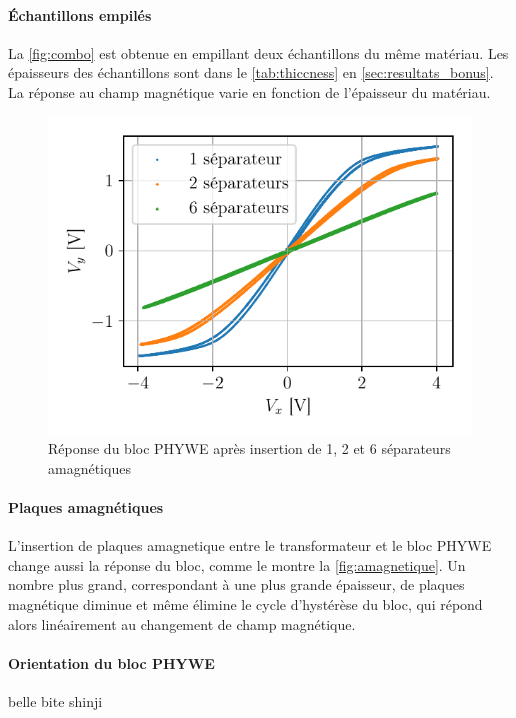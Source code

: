 \begin{minipage}{\linewidth}
    \paragraph{Échantillons empilés}
    La \autoref{fig:combo} est obtenue en empillant deux échantillons du même matériau. Les épaisseurs des échantillons sont dans le \autoref{tab:thiccness} en \autoref{sec:resultats_bonus}. La réponse au champ magnétique varie en fonction de l'épaisseur du matériau.

    \begin{figure}
        \centering
        \includegraphics[width=\linewidth]{figures/separateurs_amagnetique.pdf}
        \caption{Réponse du bloc PHYWE après insertion de 1, 2 et 6 séparateurs amagnétiques}
        \label{fig:amagnetique}
    \end{figure}

    \paragraph{Plaques amagnétiques}
    L'insertion de plaques amagnetique entre le transformateur et le bloc PHYWE change aussi la réponse du bloc, comme le montre la \autoref{fig:amagnetique}. Un nombre plus grand, correspondant à une plus grande épaisseur, de plaques magnétique diminue et même élimine le cycle d'hystérèse du bloc, qui répond alors linéairement au changement de champ magnétique.

    \paragraph{Orientation du bloc PHYWE}
    belle bite shinji
\end{minipage}
    
